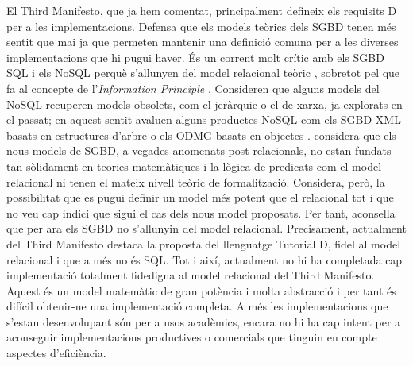 El Third Manifesto, que ja hem comentat, principalment defineix els
requisits D per a les implementacions. Defensa que els models teòrics
dels \gls{SGBD} tenen més sentit que mai ja que permeten mantenir una
definició comuna per a les diverses implementacions que hi pugui
haver.  És un corrent molt crític amb els \gls{SGBD} \gls{SQL} i els NoSQL perquè
s'allunyen del model relacional
teòric \parencite{datedarwen13:notosql_notonosql}, sobretot pel que fa
al concepte de l'\emph{Information Principle} \parencite[part
7]{date06}. Consideren que alguns models del NoSQL recuperen models
obsolets, com el jeràrquic o el de xarxa, ja explorats en el passat;
en aquest sentit avaluen alguns productes NoSQL com els \gls{SGBD} \gls{XML}
basats en estructures
d'arbre \parencite[cap.~14]{date06} \parencite[cap.~27]{date04:introduction8}
o els ODMG basats en objectes \parencite[cap.~27]{date06}.
\textcite[cap.~21--25]{date06} considera que els nous models de \gls{SGBD},
a vegades anomenats post-relacionals, no estan fundats tan sòlidament
en teories matemàtiques i la lògica de predicats com el model
relacional ni tenen el mateix nivell teòric de
formalització. %
Considera, però, la possibilitat que es pugui definir un model més
potent que el relacional tot i que no veu cap indici que sigui el cas
dels nous model proposats. Per tant, aconsella que per ara els \gls{SGBD} no
s'allunyin del model relacional. %
Precisament, actualment del Third Manifesto destaca la proposta del
llenguatge Tutorial D, fidel al model relacional i que a més no és
\gls{SQL}. Tot i així, actualment no hi ha completada cap implementació
totalment fidedigna al model relacional del Third Manifesto. Aquest és
un model matemàtic de gran potència i molta abstracció i per tant és
difícil obtenir-ne una implementació completa. A més les
implementacions que s'estan desenvolupant són per a usos acadèmics,
encara no hi ha cap intent per a aconseguir implementacions
productives o comercials que tinguin en compte aspectes d'eficiència.




